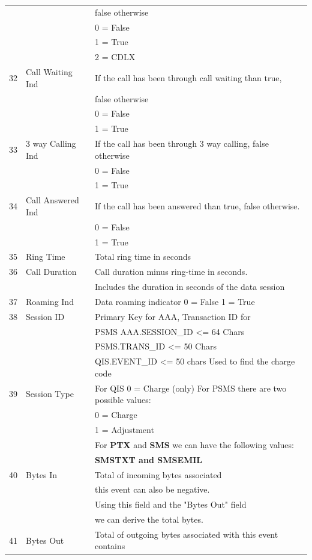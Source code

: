 \documentclass[12pt,twoside]{article}
\begin{document}
\begin{longtable}{c|l|l}
 &  & false otherwise\\
 &  & 0 = False\\
 &  & 1 = True\\
 &  & 2 = CDLX\\
32 & Call Waiting Ind & If the call has been through call waiting than true,\\
 &  & false otherwise\\
 &  & 0 = False\\
 &  & 1 = True\\
33 & 3 way Calling Ind & If the call has been through 3 way calling, false otherwise\\
 &  & 0 = False\\
 &  & 1 = True\\
34 & Call Answered Ind & If the call has been answered than true, false otherwise.\\
 &  & 0 = False\\
 &  & 1 = True\\
35 & Ring Time & Total ring time in seconds\\
36 & Call Duration & Call duration minus ring-time in seconds.\\
 &  & Includes the duration in seconds of the data session\\
37 & Roaming Ind & Data roaming indicator 0 = False 1 = True\\
38 & Session ID & Primary Key for AAA, Transaction ID for\\
 &  & PSMS AAA.SESSION\_ID <= 64 Chars\\
 &  & PSMS.TRANS\_ID <= 50 Chars\\
 &  & QIS.EVENT\_ID <= 50 chars Used to find the charge code\\
39 & Session Type & For QIS 0 = Charge (only) For PSMS there are two possible values:\\
 &  & 0 = Charge\\
 &  & 1 = Adjustment\\
 &  & For \textbf{PTX} and \textbf{SMS} we can have the following values:\\
 &  & \textbf{SMSTXT and SMSEMIL}\\
40 & Bytes In & Total of incoming bytes associated\\
 &  & this event can also be negative.\\
 &  & Using this field and the "Bytes Out" field\\
 &  & we can derive the total bytes.\\
41 & Bytes Out & Total of outgoing bytes associated with this event contains\\

\end{longtable}
\end{document}
